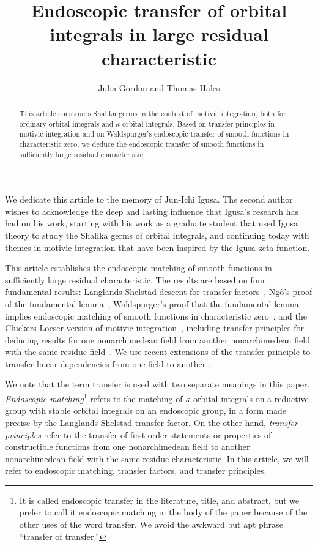 \documentclass[12pt]{amsart}
\title{Endoscopic transfer of orbital integrals in large residual characteristic}
\author{Julia Gordon and Thomas Hales}
\theoremstyle{plain}
\theoremstyle{definition}
\begin{document}
\begin{abstract} This article constructs Shalika germs in the context
  of motivic integration, both for ordinary orbital integrals and
  $\kappa$-orbital integrals.  Based on transfer principles in motivic
  integration and on Waldspurger's endoscopic transfer of smooth
  functions in characteristic zero, we deduce the endoscopic
  transfer of smooth functions in sufficiently large residual
  characteristic.
\end{abstract}



\maketitle
\linenumbers


We dedicate this article to the memory of Jun-Ichi Igusa.  The second
author wishes to acknowledge the deep and lasting influence that
Igusa's research has had on his work, starting with his work as a
graduate student that used Igusa theory to study the Shalika germs of
orbital integrals, and continuing today with themes in motivic
integration that have been inspired by the Igusa zeta function.

\bigskip

This article establishes the endoscopic matching of smooth functions
in sufficiently large residual characteristic.  The results are based
on four fundamental results: Langlands-Shelstad descent for transfer
factors~\cite{LSxf}, Ng\^o's proof of the fundamental
lemma~\cite{ngo2010lemme}, Waldspurger's proof that the fundamental lemma
implies endoscopic matching of smooth functions in characteristic
zero~\cite{waldspurger1997lemme}, and the Cluckers-Loeser version of motivic
integration~\cite{CL}, including transfer principles for deducing
results for one nonarchimedean field from another nonarchimedean field
with the same residue field~\cite{CLe}.  We use recent extensions of
the transfer principle to transfer linear dependencies from one field
to another \cite{CGH2}.

We note that the term transfer is used with two separate meanings in
this paper.  {\it Endoscopic matching}\footnote{It is called
  endoscopic transfer in the literature, title, and abstract, but we
  prefer to call it endoscopic matching in the body of the paper
  because of the other uses of the word transfer. We avoid the awkward
  but apt phrase ``transfer of transfer.''}  refers to the matching of
$\kappa$-orbital integrals on a reductive group with stable orbital
integrals on an endoscopic group, in a form made precise by the
Langlands-Shelstad transfer factor.  On the other hand, {\it transfer
  principles} refer to the transfer of first order statements or
properties of constructible functions from one nonarchimedean field to
another nonarchimedean field with the same residue characteristic.  In
this article, we will refer to endoscopic matching, transfer factors,
and transfer principles.
\end{document}

